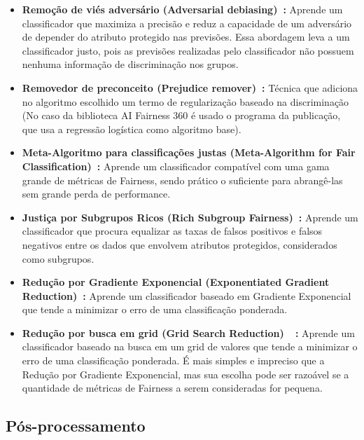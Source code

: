 \documentclass[portugues, 12pt, a4paper]{article}
\begin{document}
\begin{itemize}
\item \textbf{Remoção de viés adversário (Adversarial debiasing)~\citep{Zhang_2018}:} Aprende um classificador que maximiza a precisão e reduz a capacidade de um adversário de depender do atributo protegido nas previsões. Essa abordagem leva a um classificador justo, pois as previsões realizadas pelo classificador não possuem nenhuma informação de discriminação nos grupos.

\item \textbf{Removedor de preconceito (Prejudice remover)~\citep{Feldman_2015}:} Técnica que adiciona no algoritmo escolhido um termo de regularização baseado na discriminação (No caso da biblioteca AI Fairness 360 é usado o programa da publicação, que usa a regressão logística como algoritmo base).

\item \textbf{Meta-Algoritmo para classificações justas (Meta-Algorithm for Fair Classification)~\citep{Celis_2019}:} Aprende um classificador compatível com uma gama grande de métricas de Fairness, sendo prático o suficiente para abrangê-las sem grande perda de performance.

\item \textbf{Justiça por Subgrupos Ricos (Rich Subgroup Fairness)~\citep{Kearns_2018}:} Aprende um classificador que procura equalizar as taxas de falsos positivos e falsos negativos entre os dados que envolvem atributos protegidos, considerados como subgrupos.

\item \textbf{Redução por Gradiente Exponencial (Exponentiated Gradient Reduction)~\citep{Agarwal_2018}:} Aprende um classificador baseado em Gradiente Exponencial que tende a minimizar o erro de uma classificação ponderada.

\item \textbf{Redução por busca em grid (Grid Search Reduction)~\citep{Agarwal_2018}~\citep{Agarwal_2019}:} Aprende um classificador baseado na busca em um grid de valores que tende a minimizar o erro de uma classificação ponderada. É mais simples e impreciso que a Redução por Gradiente Exponencial, mas sua escolha pode ser razoável se a quantidade de métricas de Fairness a serem consideradas for pequena.

\end{itemize}

\subsection{Pós-processamento}
\end{document}
